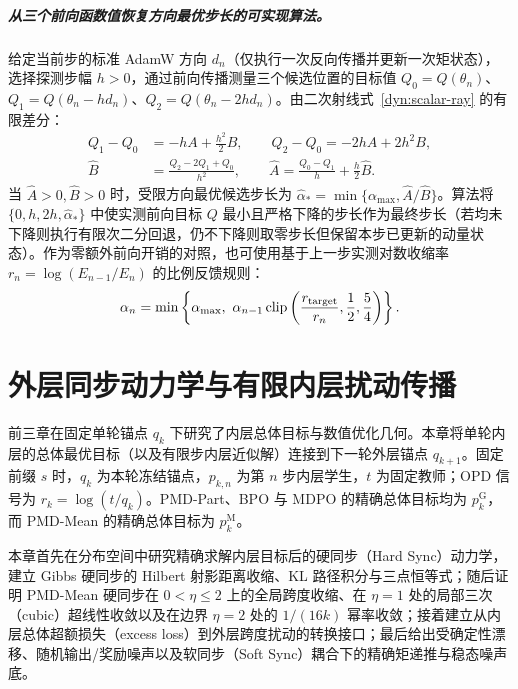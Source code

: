 \documentclass[lang=cn,scheme=chinese,openany]{elegantbook}
\begin{document}
\paragraph{从三个前向函数值恢复方向最优步长的可实现算法。}
给定当前步的标准 AdamW 方向 $d_n$（仅执行一次反向传播并更新一次矩状态），选择探测步幅 $h>0$，通过前向传播测量三个候选位置的目标值 $Q_0=Q(\theta_n)$、$Q_1=Q(\theta_n-h d_n)$、$Q_2=Q(\theta_n-2h d_n)$。由二次射线式~\eqref{dyn:scalar-ray} 的有限差分：
\begin{align}
Q_1-Q_0&=-hA+\frac{h^2}2B,\qquad
Q_2-Q_0=-2hA+2h^2B,\\
\widehat B&=\frac{Q_2-2Q_1+Q_0}{h^2},\qquad
\widehat A=\frac{Q_0-Q_1}{h}+\frac h2\widehat B.
\end{align}
当 $\widehat A>0,\widehat B>0$ 时，受限方向最优候选步长为 $\widehat\alpha_*=\min\{\alpha_{\max}, \widehat A/\widehat B\}$。算法将 $\{0, h, 2h, \widehat\alpha_*\}$ 中使实测前向目标 $Q$ 最小且严格下降的步长作为最终步长（若均未下降则执行有限次二分回退，仍不下降则取零步长但保留本步已更新的动量状态）。作为零额外前向开销的对照，也可使用基于上一步实测对数收缩率 $r_n=\log(E_{n-1}/E_n)$ 的比例反馈规则：
\begin{equation}
\alpha_n=\min\left\{\alpha_{\max},\ \alpha_{n-1}\operatorname{clip}\left(\frac{r_{\rm target}}{r_n},\frac12,\frac54\right)\right\}.
\end{equation}

\chapter{外层同步动力学与有限内层扰动传播}
\label{dyn:chapter}

前三章在固定单轮锚点 $q_k$ 下研究了内层总体目标与数值优化几何。本章将单轮内层的总体最优目标（以及有限步内层近似解）连接到下一轮外层锚点 $q_{k+1}$。固定前缀 $s$ 时，$q_k$ 为本轮冻结锚点，$p_{k,n}$ 为第 $n$ 步内层学生，$t$ 为固定教师；OPD 信号为 $r_k=\log(t/q_k)$。PMD-Part、BPO 与 MDPO 的精确总体目标均为 $p_k^{\mathrm G}$，而 PMD-Mean 的精确总体目标为 $p_k^{\mathrm M}$。

本章首先在分布空间中研究精确求解内层目标后的硬同步（Hard Sync）动力学，建立 Gibbs 硬同步的 Hilbert 射影距离收缩、KL 路径积分与三点恒等式；随后证明 PMD-Mean 硬同步在 $0<\eta\le 2$ 上的全局跨度收缩、在 $\eta=1$ 处的局部三次（cubic）超线性收敛以及在边界 $\eta=2$ 处的 $1/(16k)$ 幂率收敛；接着建立从内层总体超额损失（excess loss）到外层跨度扰动的转换接口；最后给出受确定性漂移、随机输出/奖励噪声以及软同步（Soft Sync）耦合下的精确矩递推与稳态噪声底。
\end{document}
